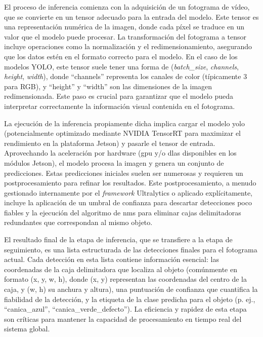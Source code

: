 \documentclass[11pt,spanish,listoffigures,listoftables]{tfgetsinf}
\begin{document}
El proceso de inferencia comienza con la adquisición de un fotograma de vídeo, que se convierte en un tensor adecuado para la entrada del modelo. Este tensor es una representación numérica de la imagen, donde cada píxel se traduce en un valor que el modelo puede procesar. La transformación del fotograma a tensor incluye operaciones como la normalización y el redimensionamiento, asegurando que los datos estén en el formato correcto para el modelo. En el caso de los modelos YOLO, este tensor suele tener una forma de (\textit{batch\_size}, \textit{channels}, \textit{height}, \textit{width}), donde ``channels'' representa los canales de color (típicamente 3 para RGB), y ``height'' y ``width'' son las dimensiones de la imagen redimensionada. Este paso es crucial para garantizar que el modelo pueda interpretar correctamente la información visual contenida en el fotograma.

La ejecución de la inferencia propiamente dicha implica cargar el modelo \gls{yolo} (potencialmente optimizado mediante NVIDIA TensorRT para maximizar el rendimiento en la plataforma Jetson) y pasarle el tensor de entrada. Aprovechando la aceleración por hardware (\gls{gpu} y/o \gls{dla}s disponibles en los módulos Jetson), el modelo procesa la imagen y genera un conjunto de predicciones. Estas predicciones iniciales suelen ser numerosas y requieren un postprocesamiento para refinar los resultados. Este postprocesamiento, a menudo gestionado internamente por el \textit{framework} Ultralytics o aplicado explícitamente, incluye la aplicación de un umbral de confianza para descartar detecciones poco fiables y la ejecución del algoritmo de \gls{nms} para eliminar cajas delimitadoras redundantes que correspondan al mismo objeto.

El resultado final de la etapa de inferencia, que se transfiere a la etapa de seguimiento, es una lista estructurada de las detecciones finales para el fotograma actual. Cada detección en esta lista contiene información esencial: las coordenadas de la caja delimitadora que localiza al objeto (comúnmente en formato (x, y, w, h), donde (x, y) representan las coordenadas del centro de la caja, y (w, h) su anchura y altura), una puntuación de confianza que cuantifica la fiabilidad de la detección, y la etiqueta de la clase predicha para el objeto (p. ej., ``canica\_azul'', ``canica\_verde\_defecto''). La eficiencia y rapidez de esta etapa son críticas para mantener la capacidad de procesamiento en tiempo real del sistema global.
\end{document}
